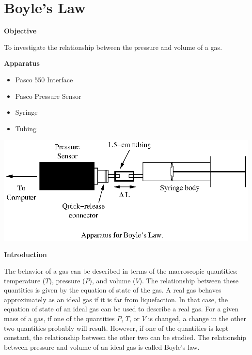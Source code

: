 \section{Boyle's Law}
\label{lab_boyles_law}

\makelabheader %

\textbf{Objective}

To investigate the relationship between the pressure and volume of
a gas.

\textbf{Apparatus}

\begin{itemize}
\item Pasco 550 Interface
\item Pasco Pressure Sensor
\item Syringe
\item Tubing
\end{itemize}
\vspace{0.3cm}
{\par\centering \includegraphics{boyles_law/boyleslawfig1.eps} \par}
\vspace{0.3cm}

\textbf{Introduction}

The behavior of a gas can be described in terms of the macroscopic quantities:
temperature ($T$), pressure ($P$), and volume ($V$). The relationship between these
quantities is given by the equation of state of the gas. A real gas behaves
approximately as an ideal gas if it is far from liquefaction. In that case,
the equation of state of an ideal gas can be used to describe a real gas. For
a given mass of a gas, if one of the quantities $P$, $T$, or $V$ is changed, a change
in the other two quantities probably will result. However, if one of the quantities
is kept constant, the relationship between the other two can be studied. The
relationship between pressure and volume of an ideal gas is called Boyle's law.

